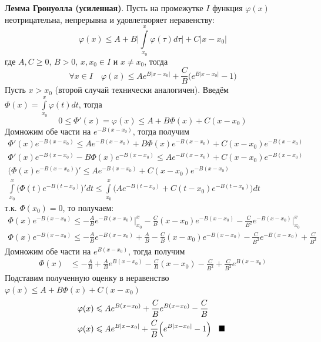 \bigbreak
\textbf{Лемма Гронуолла (усиленная)}. Пусть на промежутке $I$ функция $\varphi(x)$ неотрицательна, непрерывна и удовлетворяет неравенству:
\begin{equation*}
    \varphi(x)\leqslant A + B\Bigg|\int\limits_{x_0}^{x}\varphi(\tau)d\tau\Bigg|+C|x-x_0|
\end{equation*}
где $A, C \geqslant 0$, $B > 0$, $x, x_0 \in I$ и $x \neq x_0$, тогда
\begin{equation*}
    \forall x \in I \quad \varphi(x) \leqslant Ae^{B|x-x_0|}+ \frac{C}{B}\Big(e^{B|x-x_0|} - 1\Big)
\end{equation*}
\Proof Пусть $x > x_0$ (второй случай технически аналогичен). Введём $\Phi(x) =
\int\limits_{x_0}^{x} \varphi(t) dt $, тогда
\begin{equation*}
    0 \leqslant \Phi'(x) = \varphi(x) \leqslant A + B\Phi(x) + C(x-x_0)
\end{equation*}
Домножим обе части на $e^{-B(x-x_0)}$, тогда получим
\begin{align*}
    \Phi'(x)e^{-B(x-x_0)} \leqslant Ae^{-B(x-x_0)} + B\Phi(x)e^{-B(x-x_0)} + C(x-x_0)e^{-B(x-x_0)} \\
    \Phi'(x)e^{-B(x-x_0)} - B\Phi(x)e^{-B(x-x_0)} \leqslant Ae^{-B(x-x_0)} + C(x-x_0)e^{-B(x-x_0)} \\
    \Big(\Phi(x)e^{-B(x-x_0)}\Big)' \leqslant Ae^{-B(x-x_0)} + C(x-x_0)e^{-B(x-x_0)} \\
    \int\limits_{x_0}^x \Big(\Phi(t)e^{-B(t-x_0)}\Big)'dt \leqslant \int\limits_{x_0}^x\Big(Ae^{-B(t-x_0)} + C(t-x_0)e^{-B(t-x_0)}\Big)dt
\end{align*}
т.к. $\Phi(x_0)=0$, то получаем:
\begin{align*}
    \Phi(x)e^{-B(x-x_0)} \leqslant -\frac{A}{B}e^{-B(x-x_0)}\Big|_{x_0}^{x} -\frac{C}{B}(x-x_0)e^{-B(x-x_0)} - \frac{C}{B^2}e^{-B(x-x_0)}\Big|_{x_0}^{x} \\
    \Phi(x)e^{-B(x-x_0)} \leqslant -\frac{A}{B}e^{-B(x-x_0)} + \frac{A}{B} -\frac{C}{B}(x-x_0)e^{-B(x-x_0)} - \frac{C}{B^2}e^{-B(x-x_0)} + \frac{C}{B^2}
\end{align*}
Домножим обе части на $e^{B(x-x_0)}$, тогда получим
\begin{align*}
    \Phi(x)&\leqslant -\frac{A}{B} + \frac{A}{B}e^{B(x-x_0)} -\frac{C}{B}(x-x_0) - \frac{C}{B^2} + \frac{C}{B^2}e^{B(x-x_0)}
\end{align*}
Подставим полученную оценку в неравенство $\varphi(x) \leq A+B\Phi(x)+C(x-x_0)$
\begin{align*}
    \varphi(x) &\leqslant Ae^{B(x-x_0)} + \frac{C}{B}e^{B(x-x_0)} - \frac{C}{B}\\
    \varphi(x) &\leqslant Ae^{B|x-x_0|}+ \frac{C}{B}\Big(e^{B|x-x_0|} - 1\Big) \text{\;\; $\blacksquare$ }
\end{align*}

